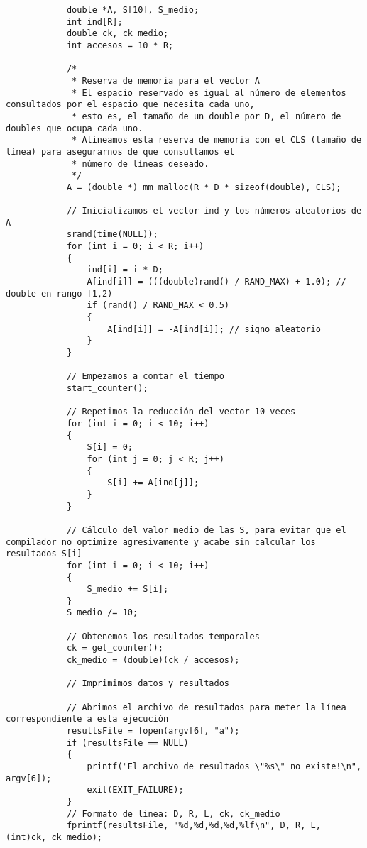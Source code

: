\documentclass[a4paper,twocolumn]{article}
\begin{document}
\begin{lstlisting}
            double *A, S[10], S_medio;
            int ind[R];
            double ck, ck_medio;
            int accesos = 10 * R;
        
            /*
             * Reserva de memoria para el vector A
             * El espacio reservado es igual al número de elementos consultados por el espacio que necesita cada uno,
             * esto es, el tamaño de un double por D, el número de doubles que ocupa cada uno.
             * Alineamos esta reserva de memoria con el CLS (tamaño de línea) para asegurarnos de que consultamos el
             * número de líneas deseado.
             */
            A = (double *)_mm_malloc(R * D * sizeof(double), CLS);
        
            // Inicializamos el vector ind y los números aleatorios de A
            srand(time(NULL));
            for (int i = 0; i < R; i++)
            {
                ind[i] = i * D;
                A[ind[i]] = (((double)rand() / RAND_MAX) + 1.0); // double en rango [1,2)
                if (rand() / RAND_MAX < 0.5)
                {
                    A[ind[i]] = -A[ind[i]]; // signo aleatorio
                }
            }
        
            // Empezamos a contar el tiempo
            start_counter();
        
            // Repetimos la reducción del vector 10 veces
            for (int i = 0; i < 10; i++)
            {
                S[i] = 0;
                for (int j = 0; j < R; j++)
                {
                    S[i] += A[ind[j]];
                }
            }
        
            // Cálculo del valor medio de las S, para evitar que el compilador no optimize agresivamente y acabe sin calcular los resultados S[i]
            for (int i = 0; i < 10; i++)
            {
                S_medio += S[i];
            }
            S_medio /= 10;
        
            // Obtenemos los resultados temporales
            ck = get_counter();
            ck_medio = (double)(ck / accesos);
        
            // Imprimimos datos y resultados
        
            // Abrimos el archivo de resultados para meter la línea correspondiente a esta ejecución
            resultsFile = fopen(argv[6], "a");
            if (resultsFile == NULL)
            {
                printf("El archivo de resultados \"%s\" no existe!\n", argv[6]);
                exit(EXIT_FAILURE);
            }
            // Formato de linea: D, R, L, ck, ck_medio
            fprintf(resultsFile, "%d,%d,%d,%d,%lf\n", D, R, L, (int)ck, ck_medio);
        

\end{lstlisting}
\end{document}

